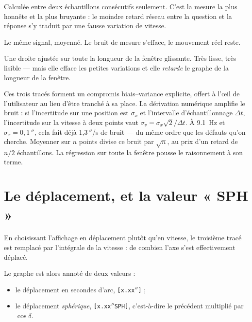 \documentclass[a4paper,11pt,twoside]{report}
\newcommand{\arcsec}{\ensuremath{''}}
\begin{document}
\begin{description}[leftmargin=0.5cm, style=nextline]
\item[Le tracé gris, fin : la vitesse brute]
Calculée entre deux échantillons consécutifs seulement. C'est la mesure la
plus honnête et la plus bruyante : le moindre retard réseau entre la question
et la réponse s'y traduit par une fausse variation de vitesse.

\item[Le tracé noir épais : la moyenne sur six échantillons]
Le même signal, moyenné. Le bruit de mesure s'efface, le mouvement réel
reste.

\item[Le tracé noir très épais : la régression linéaire]
Une droite ajustée sur toute la longueur de la fenêtre glissante. Très
lisse, très lisible --- mais elle efface les petites variations et elle
\emph{retarde} le graphe de la longueur de la fenêtre.
\end{description}

\begin{avance}
Ces trois tracés forment un compromis biais--variance explicite, offert à
l'\oe{}il de l'utilisateur au lieu d'être tranché à sa place. La dérivation
numérique amplifie le bruit : si l'incertitude sur une position est
$\sigma_x$ et l'intervalle d'échantillonnage $\Delta t$, l'incertitude sur la
vitesse à deux points vaut $\sigma_v = \sigma_x\sqrt{2}/\Delta t$. À
\SI{9,1}{\hertz} et $\sigma_x = 0{,}1\,\arcsec$, cela fait déjà
1,3\,\arcsec/s de bruit --- du même ordre que les défauts
qu'on cherche. Moyenner sur $n$ points divise ce bruit par $\sqrt{n}$, au prix
d'un retard de $n/2$ échantillons. La régression sur toute la fenêtre pousse
le raisonnement à son terme.
\end{avance}

\section{Le déplacement, et la valeur « SPH »}

En choisissant l'affichage en déplacement plutôt qu'en vitesse, le troisième
tracé est remplacé par l'intégrale de la vitesse : de combien l'axe s'est
effectivement déplacé.

\begin{prepa}
Le graphe est alors annoté de deux valeurs :
\begin{itemize}[nosep]
  \item le déplacement en secondes d'arc, \texttt{[x.xx\arcsec]} ;
  \item le déplacement \emph{sphérique}, \texttt{[x.xx\arcsec SPH]},
  c'est-à-dire le précédent multiplié par $\cos\delta$.
\end{itemize}
\end{prepa}
\end{document}
